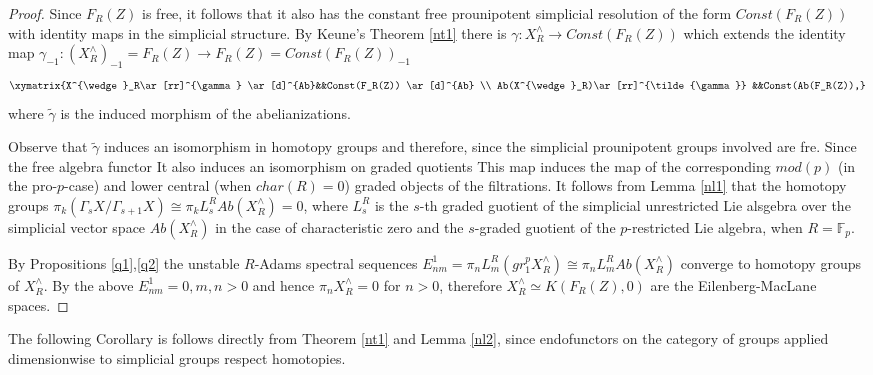 \documentclass[11pt,a4paper]{article}
\begin{document}
\begin{proof}
Since $F_R(Z)$ is free, it follows that it also has the constant free prounipotent simplicial resolution of the form $Const(F_R(Z))$ with identity maps in the simplicial structure. 
By Keune's Theorem \ref{nt1} there is $\gamma:X^{\wedge}_R\rightarrow Const(F_R(Z))$ which extends the identity map 
$\gamma_{-1}: (X^{\wedge}_R)_{-1}=F_R(Z)\rightarrow F_R(Z)=Const(F_R(Z))_{-1}$
$$\xymatrix{X^{\wedge}_R\ar[rr]^{\gamma} \ar[d]^{Ab}&&Const(F_R(Z)) \ar[d]^{Ab} \\
Ab(X^{\wedge}_R)\ar[rr]^{\tilde{\gamma}} &&Const(Ab(F_R(Z)),}$$
where $\tilde{\gamma}$ is the induced morphism of the abelianizations.

Observe that $\tilde{\gamma}$ induces an isomorphism in homotopy groups and therefore, since the simplicial prounipotent groups involved are fre. Since the free algebra functor It also induces an isomorphism on graded quotients 
This map induces the map of the corresponding $mod(p)$ (in the pro-$p$-case) and lower central (when $char(R)=0$) graded objects of the filtrations. 
It follows from Lemma \ref{nl1} that the homotopy groups $\pi_k (\Gamma_s X/\Gamma_{s+1} X)\cong \pi_k L_s^R Ab(X^{\wedge}_R)=0$, where $L_s^R$ is the $s$-th graded guotient of the simplicial unrestricted Lie alsgebra over the simplicial vector space $Ab(X^{\wedge}_R)$ in the case of characteristic zero and the $s$-graded guotient of the $p$-restricted Lie algebra, when $R=\mathbb{F}_p$.

By Propositions \ref{q1},\ref{q2} the unstable $R$-Adams spectral sequences $E^1_{nm}=\pi_n L^R_m (gr_1^p X^{\wedge}_R)\cong\pi_n L^R_m Ab(X^{\wedge}_R)$ converge to homotopy groups of $X^{\wedge}_R$. 
By the above $E^1_{nm}=0, m,n>0$ and hence $\pi_nX^{\wedge}_R=0$ for $n>0$, therefore $X^{\wedge}_R\simeq K(F_R(Z),0)$ are the Eilenberg-MacLane spaces.
\end{proof}
The following Corollary is follows directly from Theorem \ref{nt1} and Lemma \ref{nl2}, since endofunctors on the category of groups applied dimensionwise to simplicial groups respect homotopies.
\end{document}
